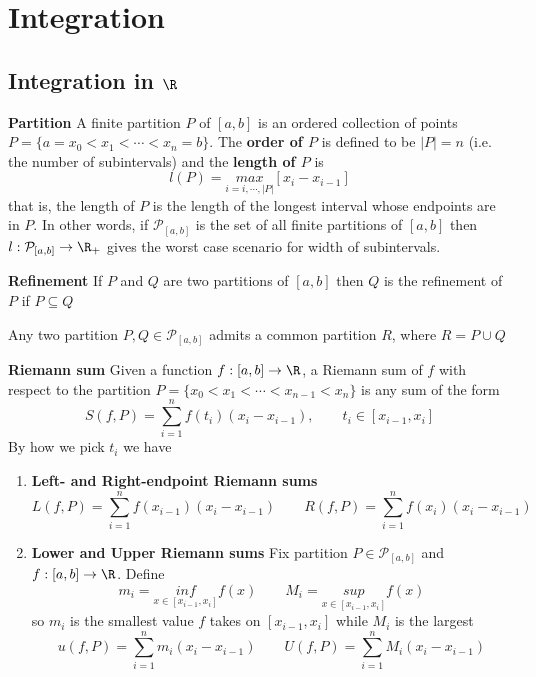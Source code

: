 \documentclass[11pt]{article}
\begin{document}
\section*{Integration}

\subsection*{Integration in $\R$}

\begin{defn*}
  \textbf{Partition} A finite partition $P$ of $[a,b]$ is an ordered collection of points $P = \{ a = x_0 < x_1 < \cdots < x_n = b\}$. The \textbf{order of $P$} is defined to be $|P| = n$ (i.e. the number of subintervals) and the \textbf{length of $P$} is
  \[
    l(P) = \underset{i = i, \cdots, |P|}{max} [x_i - x_{i-1}]
  \]
  that is, the length of $P$ is the length of the longest interval whose endpoints are in $P$. In other words, if $\mathcal{P}_{[a,b]}$ is the set of all finite partitions of $[a,b]$ then $l: \mathcal{P}_{[a,b]} \to \R_{+}$ gives the worst case scenario for width of subintervals.
\end{defn*}


\begin{defn*}
  \textbf{Refinement} If $P$ and $Q$ are two partitions of $[a,b]$ then $Q$ is the refinement of $P$ if $P\subseteq Q$
  \begin{rem}
    Any two partition $P,Q\in \mathcal{P}_{[a,b]}$ admits a common partition $R$, where $R=P\cup Q$
  \end{rem}
\end{defn*}


\begin{defn*}
  \textbf{Riemann sum} Given a function $f:[a,b]\to \R$, a Riemann sum of $f$ with respect to the partition $P = \{ x_0<x_1<\cdots <x_{n-1}<x_n\}$ is any sum of the form
  \[
    S(f, P) = \sum_{i=1}^n f(t_i) (x_i - x_{i-1}), \quad \quad t_i\in [x_{i-1}, x_i]
  \]
  By how we pick $t_i$ we have
  \begin{enumerate}
    \item \textbf{Left- and Right-endpoint Riemann sums}
    \[
      L(f, P) = \sum_{i=1}^n f(x_{i-1}) (x_i - x_{i-1}) \quad\quad R(f, P) = \sum_{i=1}^n f(x_{i}) (x_i - x_{i-1})
    \]
    \item \textbf{Lower and Upper Riemann sums} Fix partition $P\in \mathcal{P}_{[a,b]}$ and $f:[a,b]\to \R$. Define
    \[
      m_i = \underset{x\in [x_{i-1}, x_i]}{inf} f(x) \quad\quad M_i = \underset{x\in [x_{i-1}, x_i]}{sup} f(x)
    \]
    so $m_i$ is the smallest value $f$ takes on $[x_{i-1}, x_i]$ while $M_i$ is the largest
    \[
      u(f, P) = \sum_{i=1}^n m_i (x_i - x_{i-1}) \quad\quad U(f, P) = \sum_{i=1}^n M_i (x_i - x_{i-1})
    \]
  \end{enumerate}
\end{defn*}
\end{document}

